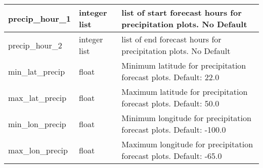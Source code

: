 \documentclass[psfig,12pt]{article}
\begin{document}
\begin{table}[H]
\begin{center}
\begin{tabular}{|p{1.60in}|p{0.5in}|p{4.15in}|}
precip\_hour\_1 & integer list & list of start forecast hours for precipitation plots.  No Default \\ \hline

precip\_hour\_2 & integer list & list of end forecast hours for precipitation plots.  No Default \\ \hline

min\_lat\_precip & float & Minimum latitude for precipitation forecast plots.  Default:  22.0 \\ \hline

max\_lat\_precip & float & Maximum latitude for precipitation forecast plots.  Default:  50.0 \\ \hline

min\_lon\_precip & float & Minimum longitude for precipitation forecast plots.  Default: -100.0 \\ \hline

max\_lon\_precip & float & Maximum longitude for precipitation forecast plots.  Default: -65.0 \\ \hline

\end{tabular}
\end{center}
\end{table}
\end{document}
